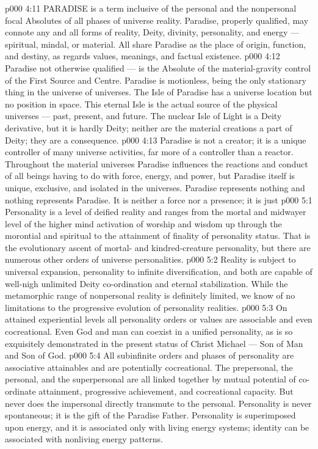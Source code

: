 \vs p000 4:11 \pc PARADISE is a term inclusive of the personal and the nonpersonal focal Absolutes of all phases of universe reality. Paradise, properly qualified, may connote any and all forms of reality, Deity, divinity, personality, and energy --- spiritual, mindal, or material. All share Paradise as the place of origin, function, and destiny, as regards values, meanings, and factual existence.
\vs p000 4:12 \pc {} Paradise not otherwise qualified --- is the Absolute of the material\hyp{}gravity control of the First Source and Centre. Paradise is motionless, being the only stationary thing in the universe of universes. The Isle of Paradise has a universe location but no position in space. This eternal Isle is the actual source of the physical universes --- past, present, and future. The nuclear Isle of Light is a Deity derivative, but it is hardly Deity; neither are the material creations a part of Deity; they are a consequence.
\vs p000 4:13 Paradise is not a creator; it is a unique controller of many universe activities, far more of a controller than a reactor. Throughout the material universes Paradise influences the reactions and conduct of all beings having to do with force, energy, and power, but Paradise itself is unique, exclusive, and isolated in the universes. Paradise represents nothing and nothing represents Paradise. It is neither a force nor a presence; it is just 
\vs p000 5:1 Personality is a level of deified reality and ranges from the mortal and midwayer level of the higher mind activation of worship and wisdom up through the morontial and spiritual to the attainment of finality of personality status. That is the evolutionary ascent of mortal\hyp{} and kindred\hyp{}creature personality, but there are numerous other orders of universe personalities.
\vs p000 5:2 Reality is subject to universal expansion, personality to infinite diversification, and both are capable of well\hyp{}nigh unlimited Deity co\hyp{}ordination and eternal stabilization. While the metamorphic range of nonpersonal reality is definitely limited, we know of no limitations to the progressive evolution of personality realities.
\vs p000 5:3 On attained experiential levels all personality orders or values are associable and even cocreational. Even God and man can coexist in a unified personality, as is so exquisitely demonstrated in the present status of Christ Michael --- Son of Man and Son of God.
\vs p000 5:4 All subinfinite orders and phases of personality are associative attainables and are potentially cocreational. The prepersonal, the personal, and the superpersonal are all linked together by mutual potential of co\hyp{}ordinate attainment, progressive achievement, and cocreational capacity. But never does the impersonal directly transmute to the personal. Personality is never spontaneous; it is the gift of the Paradise Father. Personality is superimposed upon energy, and it is associated only with living energy systems; identity can be associated with nonliving energy patterns.
